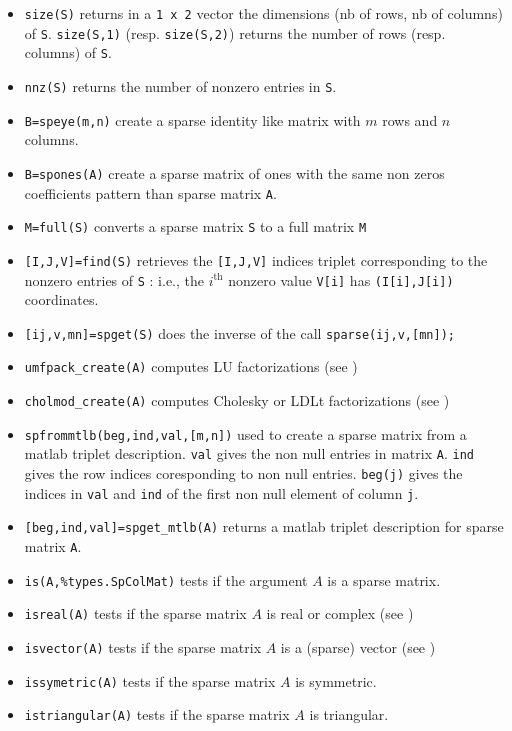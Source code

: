 \begin{itemize}
   \item \verb+size(S)+ returns in a \verb+1 x 2+ vector the dimensions (nb of rows, nb of columns)
of \verb+S+. \verb+size(S,1)+ (resp. \verb+size(S,2)+) returns the number of rows 
(resp. columns) of \verb+S+.
    \item \verb+nnz(S)+ returns the number of nonzero entries in \verb+S+.
    \item \verb+B=speye(m,n)+ create a sparse identity like matrix with $m$ rows and $n$ columns. 
    \item \verb+B=spones(A)+ create a sparse matrix of ones with the same non zeros coefficients pattern than sparse matrix \verb+A+. 
    \item \verb+M=full(S)+ converts a sparse matrix \verb+S+ to a full matrix \verb+M+ 
    \item \verb+[I,J,V]=find(S)+ retrieves the \verb+[I,J,V]+ indices triplet 
corresponding to the nonzero entries of \verb+S+ : i.e., the $i^{\mbox{th}}$ nonzero
value \verb+V[i]+ has \verb+(I[i],J[i])+ coordinates.
    \item \verb+[ij,v,mn]=spget(S)+ does the inverse of the call \verb+sparse(ij,v,[mn]);+ 
    \item \verb+umfpack_create(A)+ computes LU factorizations (see )
    \item \verb+cholmod_create(A)+ computes Cholesky or LDLt factorizations (see
      ) 
    \item \verb+spfrommtlb(beg,ind,val,[m,n])+ used to create a sparse matrix from a matlab triplet description. 
      \verb+val+ gives the non null entries in matrix \verb+A+. \verb+ind+ gives the row indices coresponding to non 
      null entries. \verb+beg(j)+ gives the indices in \verb+val+ and \verb+ind+ of the first non null element of column \verb+j+.
    \item \verb+[beg,ind,val]=spget_mtlb(A)+ returns a matlab triplet description for sparse matrix \verb+A+.
\end{itemize}

\begin{itemize}
    \item \verb+is(A,%types.SpColMat)+ tests if the argument $A$ is a sparse matrix.
    \item \verb+isreal(A)+ tests if the sparse matrix $A$ is real or complex (see )
    \item \verb+isvector(A)+ tests if the sparse matrix $A$ is a (sparse) vector (see )
    \item \verb+issymetric(A)+ tests if the sparse matrix $A$ is symmetric.
    \item \verb+istriangular(A)+ tests if the sparse matrix $A$ is triangular.
\end{itemize}



